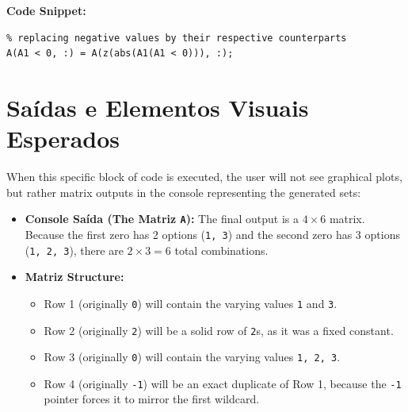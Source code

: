 \textbf{Code Snippet:}
\begin{lstlisting}
% replacing negative values by their respective counterparts
A(A1 < 0, :) = A(z(abs(A1(A1 < 0))), :);
\end{lstlisting}

\newpage
\section{Saídas e Elementos Visuais Esperados}

When this specific block of code is executed, the user will not see graphical plots, but rather matrix outputs in the console representing the generated sets:

\begin{itemize}
    \item \textbf{Console Saída (The Matriz \texttt{A}):} The final output is a $4 \times 6$ matrix. Because the first zero has 2 options (\texttt{1, 3}) and the second zero has 3 options (\texttt{1, 2, 3}), there are $2 \times 3 = 6$ total combinations. 
    \item \textbf{Matriz Structure:} 
    \begin{itemize}
        \item Row 1 (originally \texttt{0}) will contain the varying values \texttt{1} and \texttt{3}.
        \item Row 2 (originally \texttt{2}) will be a solid row of \texttt{2}s, as it was a fixed constant.
        \item Row 3 (originally \texttt{0}) will contain the varying values \texttt{1, 2, 3}.
        \item Row 4 (originally \texttt{-1}) will be an exact duplicate of Row 1, because the \texttt{-1} pointer forces it to mirror the first wildcard.
    \end{itemize}
\end{itemize}



